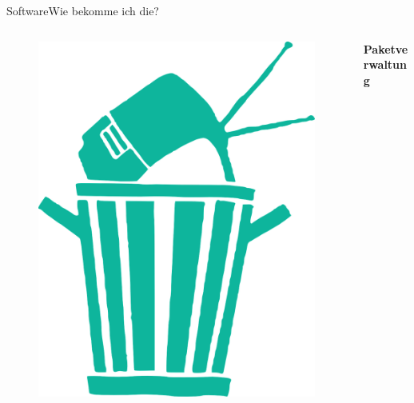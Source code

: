  \begin{frame}{Software}{Wie bekomme ich die?}

  \begin{columns}
  \begin{column}{0.3\textwidth}
 \begin{figure}
 \includegraphics[height=0.5\textheight]{resources/garbage-296550_1280.png}
 \end{figure}
\end{column}
\begin{column}{0.6\textwidth}
 \begin{center}
   \textbf{\large{ Paketverwaltung}}
 \end{center}


\end{column}
\end{columns}
\end{frame}
